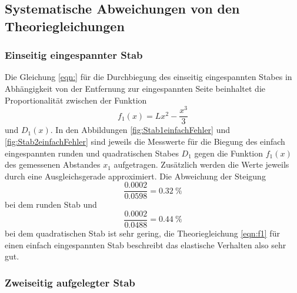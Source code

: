 \subsection{Systematische Abweichungen von den Theoriegleichungen}

\subsubsection{Einseitig eingespannter Stab}

Die Gleichung \eqref{eqn:} für die Durchbiegung des einseitig
eingespannten Stabes in Abhängigkeit von der Entfernung zur eingespannten
Seite beinhaltet die Proportionalität zwischen der Funktion
\begin{equation}
  f_1(x) = Lx^2 - \frac{x^3}{3}
  \label{eqn:f1}
\end{equation}
und $D_1(x)$. In den Abbildungen \ref{fig:Stab1einfachFehler} und
\ref{fig:Stab2einfachFehler} sind jeweils die
Messwerte für die Biegung des einfach eingespannten runden und quadratischen
Stabes $D_1$ gegen die Funktion $f_1(x)$ des gemessenen Abstandes $x_1$
aufgetragen. Zusätzlich werden die Werte jeweils durch eine Ausgleichsgerade
approximiert. Die Abweichung der Steigung
\begin{equation}
  \frac{0.0002}{0.0598} = \SI{0.32}{\percent}
\end{equation}
bei dem runden Stab und
\begin{equation}
  \frac{0.0002}{0.0488} = \SI{0.44}{\percent}
\end{equation}
bei dem quadratischen Stab ist sehr gering, die Theoriegleichung \eqref{eqn:f1}
für einen einfach eingespannten Stab beschreibt das elastische Verhalten
also sehr gut.

\subsubsection{Zweiseitig aufgelegter Stab}
\label{sec:SysAbwDoppAuf}

